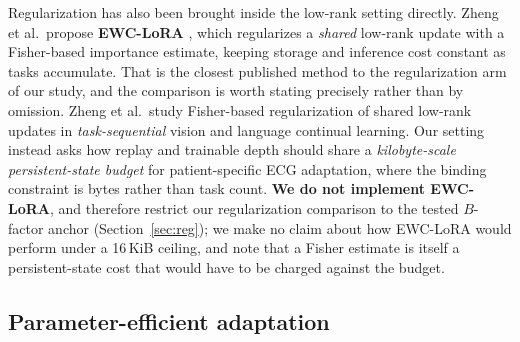 Regularization has also been brought inside the low-rank setting directly.
Zheng et al.\ propose \textbf{EWC-LoRA} \cite{zheng2026ewclora}, which
regularizes a \emph{shared} low-rank update with a Fisher-based importance
estimate, keeping storage and inference cost constant as tasks accumulate. That
is the closest published method to the regularization arm of our study, and the
comparison is worth stating precisely rather than by omission. Zheng et al.\
study Fisher-based regularization of shared low-rank updates in
\emph{task-sequential} vision and language continual learning. Our setting
instead asks how replay and trainable depth should share a \emph{kilobyte-scale
persistent-state budget} for patient-specific ECG adaptation, where the binding
constraint is bytes rather than task count. \textbf{We do not implement
EWC-LoRA}, and therefore restrict our regularization comparison to the tested
$B$-factor anchor (Section~\ref{sec:reg}); we make no claim about how EWC-LoRA
would perform under a 16\,KiB ceiling, and note that a Fisher estimate is itself
a persistent-state cost that would have to be charged against the budget.

\subsection{Parameter-efficient adaptation}

